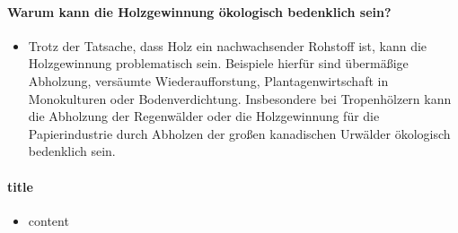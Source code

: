 \documentclass{article}
\begin{document}

\newpage
\pagestyle{fancy}
\fancyhf{}                    %

\paragraph{Warum kann die Holzgewinnung ökologisch bedenklich sein?}
\begin{itemize}
\item Trotz der Tatsache, dass Holz ein nachwachsender Rohstoff ist, kann die
  Holzgewinnung problematisch sein. Beispiele hierfür sind übermäßige
  Abholzung, versäumte Wiederaufforstung, Plantagenwirtschaft in Monokulturen
  oder Bodenverdichtung. Insbesondere bei Tropenhölzern kann die Abholzung der
  Regenwälder oder die Holzgewinnung für die Papierindustrie durch Abholzen der
  großen kanadischen Urwälder ökologisch bedenklich sein.
\end{itemize}



\newpage
\pagestyle{fancy}
\fancyhf{}                    %

\paragraph{title}
\begin{itemize}
\item content%
\end{itemize}



\newpage
\pagestyle{fancy}
\fancyhf{}                    %
\end{document}
